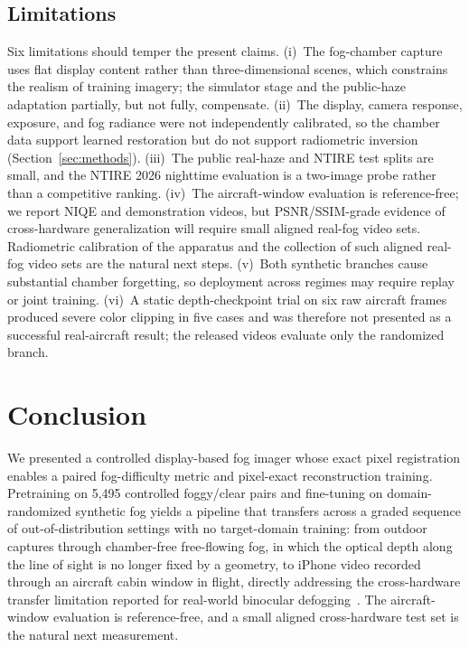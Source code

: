 \documentclass{optica-article}
\begin{document}
\subsection{Limitations}
\label{sec:limitations}
Six limitations should temper the present claims. (i)~The
fog-chamber capture uses flat display content rather than
three-dimensional scenes, which constrains the realism of training
imagery; the simulator stage and the public-haze adaptation
partially, but not fully, compensate. (ii)~The display, camera
response, exposure, and fog radiance were not independently
calibrated, so the chamber data support learned restoration but do
not support radiometric inversion (Section~\ref{sec:methods}).
(iii)~The public real-haze and NTIRE test splits are small, and
the NTIRE 2026 nighttime evaluation is a two-image probe rather
than a competitive ranking. (iv)~The aircraft-window evaluation
is reference-free; we report NIQE and demonstration videos, but
PSNR/SSIM-grade evidence of cross-hardware generalization will
require small aligned real-fog video sets. Radiometric calibration
of the apparatus and the collection of such aligned real-fog video
sets are the natural next steps. (v)~Both synthetic branches cause
substantial chamber forgetting, so deployment across regimes may require
replay or joint training. (vi)~A static depth-checkpoint trial on six raw
aircraft frames produced severe color clipping in five cases and was
therefore not presented as a successful real-aircraft result; the
released videos evaluate only the randomized branch.
 
\section{Conclusion}
\label{sec:conclusion}

We presented a controlled display-based fog imager whose exact pixel
registration enables a paired fog-difficulty metric and pixel-exact
reconstruction training. Pretraining on 5{,}495 controlled foggy/clear
pairs and fine-tuning on domain-randomized synthetic fog yields a
pipeline that transfers across a graded sequence of out-of-distribution
settings with no target-domain training: from outdoor captures through
chamber-free free-flowing fog, in which the optical depth along the
line of sight is no longer fixed by a geometry, to iPhone video
recorded through an aircraft cabin window in flight, directly
addressing the cross-hardware transfer limitation reported for
real-world binocular defogging~\cite{pollak2024stereofog}. The
aircraft-window evaluation is reference-free, and a small aligned
cross-hardware test set is the natural next measurement.
\end{document}
